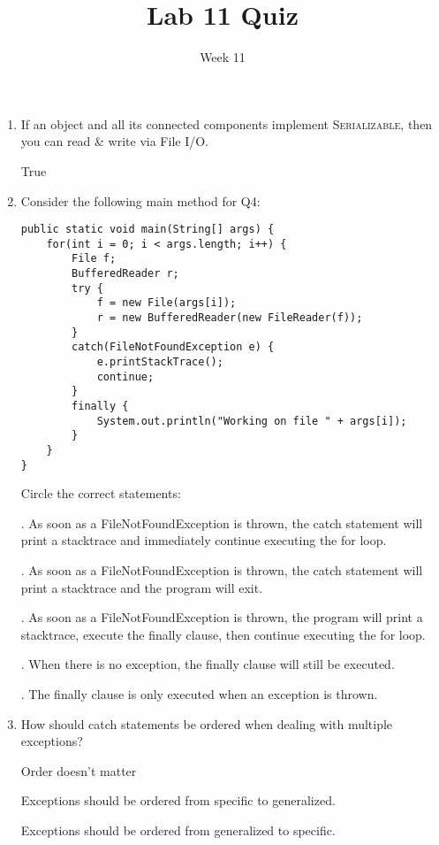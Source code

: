 \documentclass[addpoints]{exam}
\title{Lab 11 Quiz}
\date{Week 11}
\newcommand{\RN}[1]{%
  \textup{\uppercase\expandafter{\romannumeral#1}}%
}
\begin{document}
 

\Instructions

\begin{enumerate}
\vspace{2em}



\newline

\item
\question {} \tf If an object and all its connected components implement \textsc{Serializable}, then you can read \& write via File I/O.

\newline
\Ans True
\newline
\item
\question {}


Consider the following main method for Q4:

\begin{lstlisting}
public static void main(String[] args) {
    for(int i = 0; i < args.length; i++) {
        File f;
        BufferedReader r;
        try {
            f = new File(args[i]);
            r = new BufferedReader(new FileReader(f));
        }
        catch(FileNotFoundException e) {
		    e.printStackTrace();
            continue;
        }
        finally {
            System.out.println("Working on file " + args[i]);
        }
    }
}
\end{lstlisting}

Circle the correct statements:
\newline

\RN{1}. As soon as a FileNotFoundException is thrown, the catch statement will print a stacktrace and immediately continue executing the for loop.

\RN{2}. As soon as a FileNotFoundException is thrown, the catch statement will print a stacktrace and the program will exit.

\RN{3}. As soon as a FileNotFoundException is thrown, the program will print a stacktrace, execute the finally clause, then continue executing the for loop. \Ans

\RN{4}. When there is no exception, the finally clause will still be executed. \Ans

\RN{5}. The finally clause is only executed when an exception is thrown.



\item
\question {} How should catch statements be ordered when dealing with multiple exceptions? 
\newline
\begin{choices} 

 \choice Order doesn't matter 
 
 \choice \Ans Exceptions should be ordered from specific to generalized. 
 
 \choice Exceptions should be ordered from generalized to specific. 
 

\end{choices}

\newline
\newline

\vspace{2em}
\end{enumerate}
\end{document}
